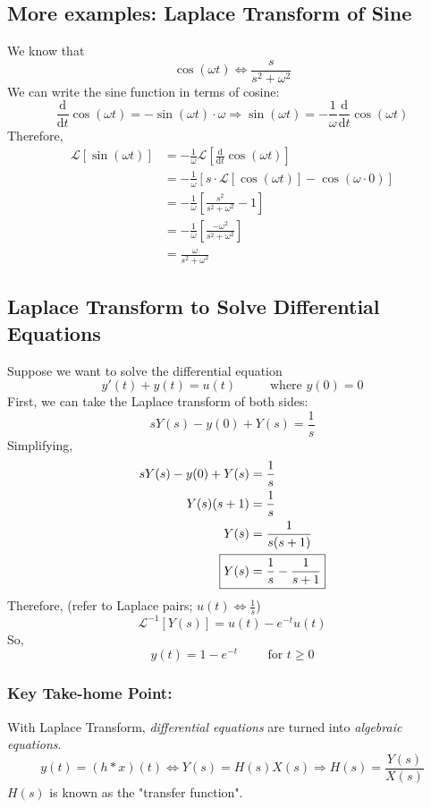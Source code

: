 \documentclass[10pt]{article}
\newcommand{\llra}{\Longleftrightarrow}
\newcommand{\laplace}{\mathcal{L}}
\newcommand{\dd}{\text{d}}
\begin{document}
\subsection*{More examples: Laplace Transform of Sine}
We know that
\[\cos(\omega t) \llra \frac{s}{s^2 + \omega^2}\]
We can write the sine function in terms of cosine:
\[\frac{\dd}{\dd t} \cos(\omega t) = -\sin(\omega t) \cdot \omega \Longrightarrow \sin(\omega t) = -\frac{1}{\omega} \frac{\dd}{\dd t} \cos(\omega t)\]
Therefore,
\begin{align*}
    \laplace[\sin(\omega t)] &= -\frac{1}{\omega} \laplace\left[\frac{\dd}{\dd t} \cos(\omega t)\right]\\
    &= -\frac{1}{\omega} \left[s \cdot \laplace[\cos(\omega t)] - \cos(\omega \cdot 0)\right]\\
    &= -\frac{1}{\omega} \left[\frac{s^2}{s^2 + \omega^2} - 1\right]\\
    &= -\frac{1}{\omega} \left[\frac{-\omega^2}{s^2 + \omega^2}\right]\\
    &= \frac{\omega}{s^2 + \omega^2}
\end{align*}

\subsection*{Laplace Transform to Solve Differential Equations}
Suppose we want to solve the differential equation
\[y'(t) + y(t) = u(t) \hspace{1cm} \text{ where $y(0) = 0$}\]
First, we can take the Laplace transform of both sides:
\[sY(s) - y(0) + Y(s) = \frac{1}{s}\]
Simplifying,
\begin{align*}
    sY(s) - y(0) + Y(s) &= \frac{1}{s}\\
    Y(s)(s + 1) &= \frac{1}{s}\\
    Y(s) &= \frac{1}{s(s + 1)}\\
    \Aboxed{Y(s) &= \frac{1}{s} - \frac{1}{s + 1}}\\
\end{align*}
Therefore, (refer to Laplace pairs; $u(t) \llra \frac{1}{s}$)
\[\laplace^{-1}[Y(s)] = u(t) - e^{-t} u(t)\]
So,
\[y(t) = 1 - e^{-t} \hspace{1cm} \text{for $t \geq 0$}\]
\subsubsection*{Key Take-home Point:}
With Laplace Transform, \textit{differential equations} are turned into \textit{algebraic equations}.
\[y(t) = (h * x)(t) \llra Y(s) = H(s) X(s) \Longrightarrow H(s) = \frac{Y(s)}{X(s)}\]
$H(s)$ is known as the "transfer function".
\end{document}
